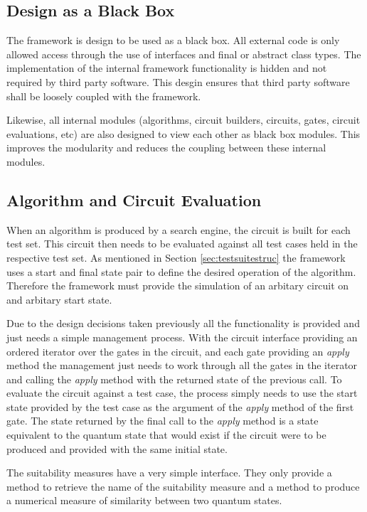\subsection{Design as a Black Box}
The framework is design to be used as a black box.
All external code is only allowed access through the use of interfaces and final or abstract class types.
The implementation of the internal framework functionality is hidden and not required by third party software.
This desgin ensures that third party software shall be loosely coupled with the framework.

Likewise, all internal modules (algorithms, circuit builders, circuits, gates, circuit evaluations, etc) are also designed to view each other as black box modules.
This improves the modularity and reduces the coupling between these internal modules.

\subsection{Algorithm and Circuit Evaluation}
\label{sec:cireval}
When an algorithm is produced by a search engine, the circuit is built for each test set.
This circuit then needs to be evaluated against all test cases held in the respective test set.
As mentioned in Section \ref{sec:testsuitestruc} the framework uses a start and final state pair to define the desired operation of the algorithm.
Therefore the framework must provide the simulation of an arbitary circuit on and arbitary start state.

Due to the design decisions taken previously all the functionality is provided and just needs a simple management process.
With the circuit interface providing an ordered iterator over the gates in the circuit, and each gate providing an \emph{apply} method the management just needs to work through all the gates in the iterator and calling the \emph{apply} method with the returned state of the previous call.
To evaluate the circuit against a test case, the process simply needs to use the start state provided by the test case as the argument of the \emph{apply} method of the first gate.
The state returned by the final call to the \emph{apply} method is a state equivalent to the quantum state that would exist if the circuit were to be produced and provided with the same initial state.

The suitability measures have a very simple interface.
They only provide a method to retrieve the name of the suitability measure and a method to produce a numerical measure of similarity between two quantum states.

